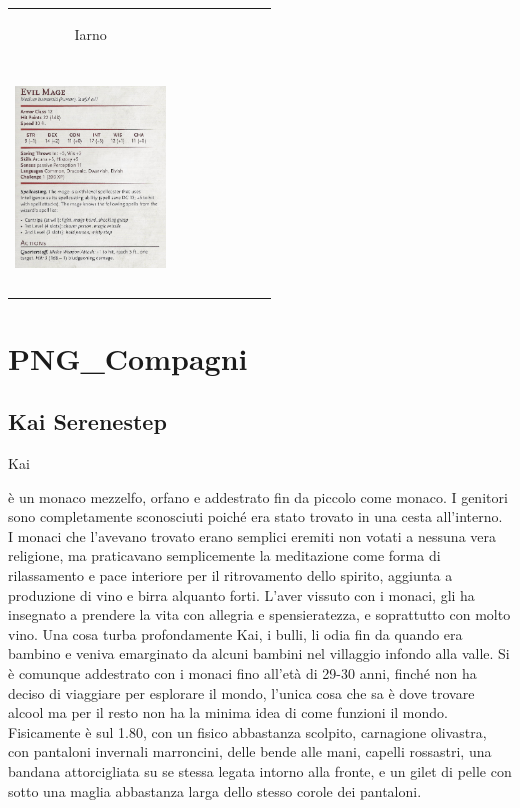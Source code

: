 \documentclass{article}
\begin{document}
\begin{table}
\begin{tabular}{cr|cr|cr|cr}
            \hline
              \hypertarget{Iarno}{Iarno} & \\
              \includegraphics[width=4cm,height = 6cm]{../Mostri/HalmunKost.png}&\\
            
            
    \end{tabular}
\end{table}
\newpage
\section{PNG\_Compagni}
\subsection{Kai Serenestep}\hypertarget{kai}{Kai} è un monaco mezzelfo, orfano e addestrato fin da piccolo come monaco. I genitori sono completamente sconosciuti poiché era stato trovato in una cesta all'interno. I monaci che l'avevano trovato erano semplici eremiti non votati a nessuna vera religione, ma praticavano semplicemente la meditazione come forma di rilassamento e pace interiore per il ritrovamento dello spirito, aggiunta a produzione di vino e birra alquanto forti. L'aver vissuto con i monaci, gli ha insegnato a prendere la vita con allegria e spensieratezza, e soprattutto con molto vino. Una cosa turba profondamente Kai, i bulli, li odia fin da quando era bambino e veniva emarginato da alcuni bambini nel villaggio infondo alla valle. Si è comunque addestrato con i monaci fino all'età di 29-30 anni, finché non ha deciso di viaggiare per esplorare il mondo, l'unica cosa che sa è dove trovare alcool ma per il resto non ha la minima idea di come funzioni il mondo. Fisicamente è sul 1.80, con un fisico abbastanza scolpito, carnagione olivastra, con pantaloni invernali marroncini, delle bende alle mani, capelli rossastri, una bandana attorcigliata su se stessa legata intorno alla fronte, e un gilet di pelle con sotto una maglia abbastanza larga dello stesso corole dei pantaloni.  
\end{document}
